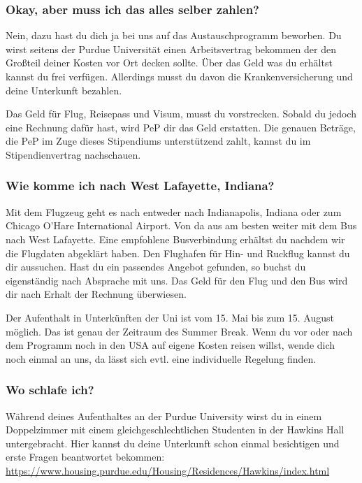 \documentclass[
  paper=a4,
  fontsize=12pt,
  DIV=16,
  headheight=52pt,
  footheight=45pt,
  headinclude,
  parskip=full,
]{scrartcl}
\begin{document}
\subsubsection*{Okay, aber muss ich das alles selber zahlen?}
Nein, dazu hast du dich ja bei uns auf das Austauschprogramm beworben.
Du wirst seitens der Purdue Universität einen Arbeitsvertrag bekommen der den Großteil deiner Kosten vor Ort decken sollte.
Über das Geld was du erhältst kannst du frei verfügen.
Allerdings musst du davon die Krankenversicherung und deine Unterkunft bezahlen.

Das Geld für Flug, Reisepass und Visum, musst du vorstrecken.
Sobald du jedoch eine Rechnung dafür hast, wird PeP dir das Geld erstatten.
Die genauen Beträge, die PeP im Zuge dieses Stipendiums unterstützend zahlt, kannst du im Stipendienvertrag nachschauen.

\subsubsection*{Wie komme ich nach West Lafayette, Indiana?}
Mit dem Flugzeug geht es nach entweder nach Indianapolis, Indiana oder zum
Chicago O'Hare International Airport.
Von da aus am besten weiter mit dem Bus nach West Lafayette.
Eine empfohlene Busverbindung erhältst du nachdem wir die Flugdaten abgeklärt
haben.
Den Flughafen für Hin- und Ruckflug kannst du dir aussuchen.
Hast du ein passendes Angebot gefunden, so buchst du eigenständig nach Absprache mit uns.
Das Geld für den Flug und den Bus wird dir nach Erhalt der Rechnung überwiesen.

Der Aufenthalt in Unterkünften der Uni ist vom 15. Mai bis zum 15. August
möglich. Das ist genau der Zeitraum des Summer Break. Wenn du vor oder nach dem
Programm noch in den USA auf eigene Kosten reisen willst, wende dich noch einmal an uns, da lässt sich evtl. eine individuelle Regelung finden.


\subsubsection*{Wo schlafe ich?}
Während deines Aufenthaltes an der Purdue University wirst du in einem Doppelzimmer mit einem gleichgeschlechtlichen Studenten in der Hawkins Hall untergebracht.
Hier kannst du deine Unterkunft schon einmal besichtigen und erste Fragen beantwortet bekommen: \url{https://www.housing.purdue.edu/Housing/Residences/Hawkins/index.html}
\end{document}
